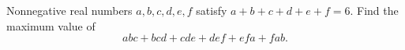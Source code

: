 Nonnegative real numbers $a,b,c,d,e,f$ satisfy $a+b+c+d+e+f=6$. Find the maximum value of
\[
abc+bcd+cde+def+efa+fab .
\]
